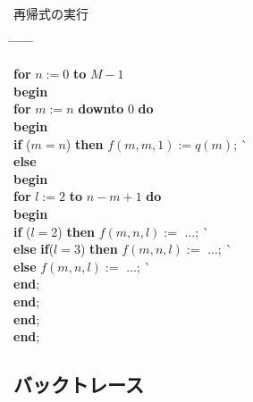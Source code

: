 \begin{algorithm}{再帰式の実行} \label{alg:recursion}
 \rm
 \begin{tabbing}
  \hspace*{5mm} \= \hspace*{3mm} \= \hspace*{3mm} \= \hspace*{3mm} \=
  \hspace*{3mm} \= \hspace*{3mm} \= \hspace*{3mm} \+ \kill

 {\bf for} $n:= 0$ {\bf to} $M-1$ {\do} \+ \\
   {\bf begin}\\
   {\bf for} $m:= n$ {\bf downto} $0$ {\bf do} \+ \\
     {\bf begin}\\
     {\bf if} ($m= n$) {\bf then} $f(m, m, 1):= q(m)$;
                         \` \\
     {\bf else} \+ \\
       {\bf begin}\\
       {\bf for} $l:= 2$ {\bf to} $n-m+1$ {\bf do} \+ \\
         {\bf begin}\\
         {\bf if} ($l= 2$) {\bf then} $f(m, n, l):=$ ...;
                         \` \\
         {\bf else} {\bf if}($l= 3$) {\bf then} $f(m, n, l):=$ ...;
                         \` \\
         {\bf else} $f(m, n, l):=$ ...;
                         \`  \\
        {\bf end}; \- \\
      {\bf end}; \- \\
    {\bf end}; \- \\
  {\bf end};
 \end{tabbing}
\end{algorithm}

\subsection{バックトレース}

